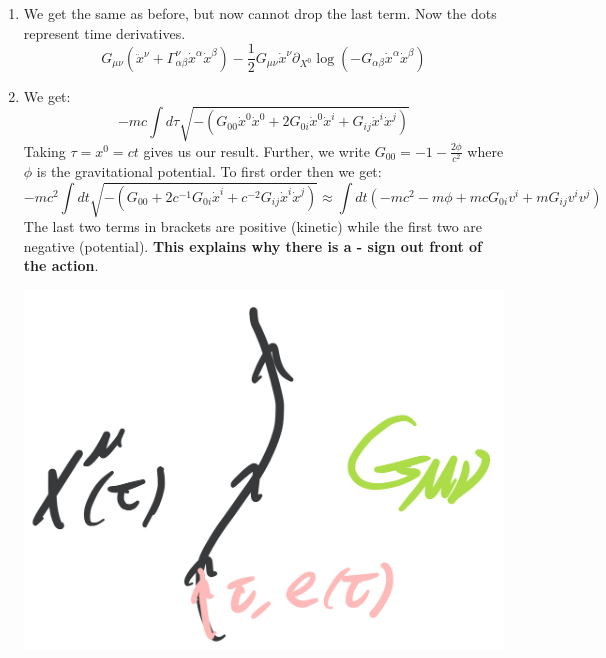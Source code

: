 \documentclass[11pt, class=article, crop=false]{standalone}
\begin{document}
\begin{enumerate}
		\item We get the same as before, but now cannot drop the last term. Now the dots represent time derivatives.
		\begin{equation}
			 G_{\mu \nu} (\ddot x^\nu + \Gamma^\nu_{\alpha \beta} \dot x^\alpha \dot x^\beta) - \frac12 G_{\mu \nu} \dot x^\nu \partial_{X^0} \log(-G_{\alpha \beta} \dot x^\alpha \dot x^\beta)
		\end{equation}
		
		\item We get: 
		\begin{equation}
			-m c \int d\tau \sqrt{-(G_{00} \dot x^0 \dot x^0 + 2 G_{0i} \dot x^0 \dot x^i + G_{ij} \dot x^i \dot x^j)}
		\end{equation}
		Taking $\tau = x^0 = ct$ gives us our result. Further, we write $G_{00} = -1 - \frac{2 \phi}{c^2}$ where $\phi$ is the gravitational potential. To first order then we get:
		\begin{equation}
			-m c^2 \int dt \sqrt{-(G_{00} + 2 c^{-1} G_{0i} \dot x^i +  c^{-2} G_{ij} \dot x^i \dot x^j)} \approx  \int dt \left(- m c^2 - m \phi  + m c G_{0 i} v^i +  m G_{ij} v^i v^j\right)
		\end{equation}
		The last two terms in brackets are positive (kinetic) while the first two are negative (potential). \textbf{This explains why there is a - sign out front of the action}.
		
		\begin{center}
			\includegraphics[scale=0.12]{Drawings/Particle}
		\end{center}
		

\end{enumerate}
\end{document}
